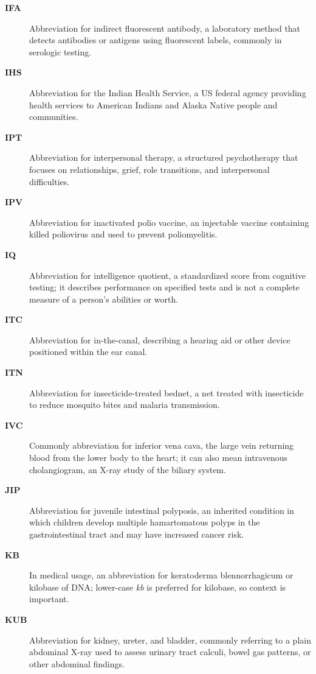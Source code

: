 \begin{description}
\item[\textbf{IFA}] Abbreviation for indirect fluorescent antibody, a laboratory method that detects antibodies or antigens using fluorescent labels, commonly in serologic testing.

\item[\textbf{IHS}] Abbreviation for the Indian Health Service, a US federal agency providing health services to American Indians and Alaska Native people and communities.

\item[\textbf{IPT}] Abbreviation for interpersonal therapy, a structured psychotherapy that focuses on relationships, grief, role transitions, and interpersonal difficulties.

\item[\textbf{IPV}] Abbreviation for inactivated polio vaccine, an injectable vaccine containing killed poliovirus and used to prevent poliomyelitis.

\item[\textbf{IQ}] Abbreviation for intelligence quotient, a standardized score from cognitive testing; it describes performance on specified tests and is not a complete measure of a person's abilities or worth.

\item[\textbf{ITC}] Abbreviation for in-the-canal, describing a hearing aid or other device positioned within the ear canal.

\item[\textbf{ITN}] Abbreviation for insecticide-treated bednet, a net treated with insecticide to reduce mosquito bites and malaria transmission.

\item[\textbf{IVC}] Commonly abbreviation for inferior vena cava, the large vein returning blood from the lower body to the heart; it can also mean intravenous cholangiogram, an X-ray study of the biliary system.

\item[\textbf{JIP}] Abbreviation for juvenile intestinal polyposis, an inherited condition in which children develop multiple hamartomatous polyps in the gastrointestinal tract and may have increased cancer risk.

\item[\textbf{KB}] In medical usage, an abbreviation for keratoderma blennorrhagicum or kilobase of DNA; lower-case \textit{kb} is preferred for kilobase, so context is important.

\item[\textbf{KUB}] Abbreviation for kidney, ureter, and bladder, commonly referring to a plain abdominal X-ray used to assess urinary tract calculi, bowel gas patterns, or other abdominal findings.


\end{description}
